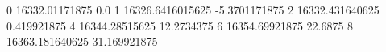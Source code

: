 0 16332.01171875 0.0
1 16326.6416015625 -5.3701171875
2 16332.431640625 0.419921875
4 16344.28515625 12.2734375
6 16354.69921875 22.6875
8 16363.181640625 31.169921875
